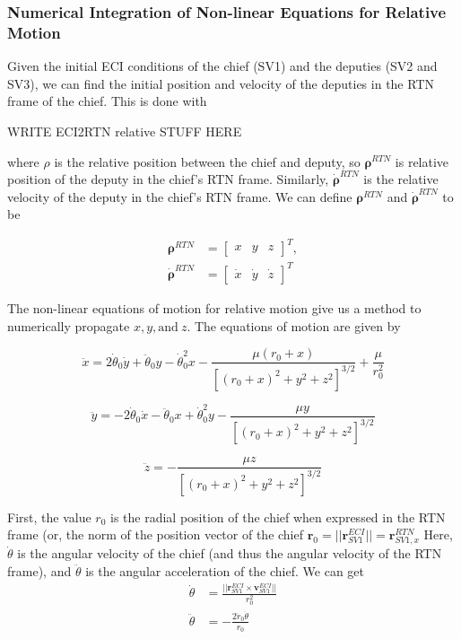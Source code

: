 \subsubsection{Numerical Integration of Non-linear Equations for Relative Motion}
Given the initial ECI conditions of the chief (SV1) and the deputies (SV2 and SV3), we can find the initial position and velocity of the deputies in the RTN frame of the chief. This is done with

WRITE ECI2RTN relative STUFF HERE

where $\rho$ is the relative position between the chief and deputy, so $\boldsymbol{\rho}^{RTN}$ is relative position of the deputy in the chief's RTN frame. Similarly, $\boldsymbol{\dot{\rho}}^{RTN}$ is the relative velocity of the deputy in the chief's RTN frame. We can define $\boldsymbol{\rho}^{RTN}$ and $\boldsymbol{\dot{\rho}}^{RTN}$ to be

\begin{align}
    \boldsymbol{\rho}^{RTN} &= \begin{bmatrix}
        x & y & z
    \end{bmatrix}^T, \\
    \boldsymbol{\dot{\rho}}^{RTN} &= \begin{bmatrix}
        \dot{x} & \dot{y} & \dot{z}
    \end{bmatrix}^T 
\end{align}

The non-linear equations of motion for relative motion give us a method to numerically propagate $x, y, \text{and} \ z$. The equations of motion are given by

\begin{equation*}
\ddot{x} = 2\dot{\theta}_0 \dot{y} + \ddot{\theta}_0 y - \dot{\theta}_0^2 x -\frac{\mu (r_0 + x)}{\left[(r_0 + x)^2 + y^2 + z^2\right]^{3/2}} + \frac{\mu}{r_0^2}
\end{equation*}

\begin{equation*}
\ddot{y} = - 2\dot{\theta}_0 \dot{x} - \ddot{\theta}_0 x + \dot{\theta}_0^2 y  -\frac{\mu y}{\left[(r_0 + x)^2 + y^2 + z^2\right]^{3/2}}
\end{equation*}

\begin{equation*}
\ddot{z} = -\frac{\mu z}{\left[(r_0 + x)^2 + y^2 + z^2\right]^{3/2}}
\end{equation*}

First, the value $r_0$ is the radial position of the chief when expressed in the RTN frame (or, the norm of the position vector of the chief $\boldsymbol{r}_0 = ||\boldsymbol{r}^{ECI}_{SV1}|| = \boldsymbol{r}^{RTN}_{SV1, x}$ 
Here, $\dot{\theta}$ is the angular velocity of the chief (and thus the angular velocity of the RTN frame), and $\ddot{\theta}$ is the angular acceleration of the chief. We can get 
\begin{align}
    \dot{\theta} &= \frac{{||\boldsymbol{r}_{SV1}^{ECI} \times \boldsymbol{v}_{SV1}^{ECI}||}}{r_0^2} \\
    \ddot{\theta} &= -\frac{2\dot{r}_0\dot{\theta}}{r_0}
\end{align}

